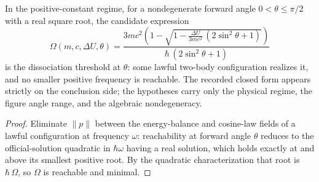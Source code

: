 \begin{theorem}
\label{thm:IPhO2026Problems_problem_IPhO_2026_1_C_1:minimum_angular_frequency_T1_C1}
In the positive-constant regime, for a nondegenerate forward angle
$0 < \theta \le \pi/2$ with a real square root, the candidate expression
\[
\Omega(m,c,\Delta U,\theta)
= \frac{3 m c^2 \left(1 - \sqrt{1 - \frac{\Delta U}{3 m c^2}\,(2\sin^2\theta + 1)}\right)}{\hbar\,(2\sin^2\theta + 1)}
\]
is the dissociation threshold at $\theta$: some lawful two-body
configuration realizes it, and no smaller positive frequency is reachable.
The recorded closed form appears strictly on the conclusion side; the
hypotheses carry only the physical regime, the figure angle range, and the
algebraic nondegeneracy.
\end{theorem}
\begin{proof}
Eliminate $\|p\|$ between the energy-balance and cosine-law fields of a
lawful configuration at frequency $\omega$: reachability at forward angle
$\theta$ reduces to the official-solution quadratic in $\hbar\omega$
having a real solution, which holds exactly at and above its smallest
positive root.  By the quadratic characterization that root is
$\hbar\,\Omega$, so $\Omega$ is reachable and minimal.
\end{proof}

